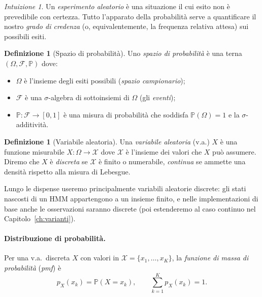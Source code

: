\documentclass[11pt,a4paper,oneside]{book}
\theoremstyle{plain}
\theoremstyle{definition}
\newtheorem{definizione}[teorema]{Definizione}
\theoremstyle{remark}
\newtheorem*{intuizione}{Intuizione}
\newcommand{\Prob}{\mathbb{P}}
\begin{document}
\begin{intuizione}
Un \emph{esperimento aleatorio} è una situazione il cui esito non è
prevedibile con certezza. Tutto l'apparato della probabilità serve a
quantificare il nostro \emph{grado di credenza} (o, equivalentemente,
la frequenza relativa attesa) sui possibili esiti.
\end{intuizione}

\begin{definizione}[Spazio di probabilità]
Uno \emph{spazio di probabilità} è una terna $(\Omega,\mathcal{F},\Prob)$
dove:
\begin{itemize}[leftmargin=*]
    \item $\Omega$ è l'insieme degli esiti possibili (\emph{spazio
          campionario});
    \item $\mathcal{F}$ è una $\sigma$-algebra di sottoinsiemi di
          $\Omega$ (gli \emph{eventi});
    \item $\Prob:\mathcal{F}\to[0,1]$ è una misura di probabilità che
          soddisfa $\Prob(\Omega)=1$ e la $\sigma$-additività.
\end{itemize}
\end{definizione}

\begin{definizione}[Variabile aleatoria]
Una \emph{variabile aleatoria} (v.a.) $X$ è una funzione misurabile
$X:\Omega\to\mathcal{X}$ dove $\mathcal{X}$ è l'insieme dei valori che
$X$ può assumere. Diremo che $X$ è \emph{discreta} se $\mathcal{X}$ è
finito o numerabile, \emph{continua} se ammette una densità rispetto
alla misura di Lebesgue.
\end{definizione}

Lungo le dispense useremo principalmente variabili aleatorie discrete:
gli stati nascosti di un HMM appartengono a un insieme finito, e nelle
implementazioni di base anche le osservazioni saranno discrete (poi
estenderemo al caso continuo nel Capitolo~\ref{ch:varianti}).

\paragraph{Distribuzione di probabilità.}
Per una v.a.\ discreta $X$ con valori in $\mathcal{X}=\{x_1,\dots,x_K\}$,
la \emph{funzione di massa di probabilità} (\emph{pmf}) è
\begin{equation}
    p_X(x_k) = \Prob(X=x_k), \qquad
    \sum_{k=1}^{K} p_X(x_k) = 1.
\end{equation}
\end{document}
